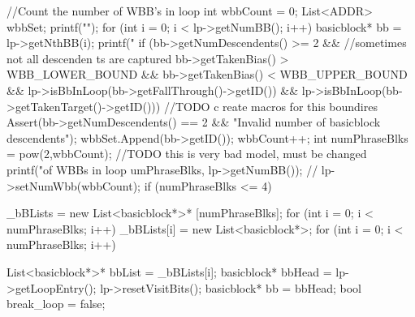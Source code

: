\begin{DoxyCode}
                                            {
        //Count the number of WBB's in loop
        int wbbCount = 0;
        List<ADDR> wbbSet;
        printf("\n");
        for (int i = 0; i < lp->getNumBB(); i++) {
                basicblock* bb = lp->getNthBB(i);
                printf("%
                if (bb->getNumDescendents() >= 2 && //sometimes not all descenden
      ts are captured
                        bb->getTakenBias() > WBB_LOWER_BOUND && 
                    bb->getTakenBias() < WBB_UPPER_BOUND &&
                    lp->isBbInLoop(bb->getFallThrough()->getID()) &&
                        lp->isBbInLoop(bb->getTakenTarget()->getID())) { //TODO c
      reate macros for this boundires
                        Assert(bb->getNumDescendents() == 2 && "Invalid number of
       basicblock descendents\n");
                        wbbSet.Append(bb->getID());
                        wbbCount++;
                }
        }
        int numPhraseBlks = pow(2,wbbCount); //TODO this is very bad model, must 
      be changed
        printf("\nnumber of WBBs in loop %
      umPhraseBlks, lp->getNumBB());
        // lp->setNumWbb(wbbCount);
        if (numPhraseBlks <= 4) {
                _bBLists = new List<basicblock*>* [numPhraseBlks];
                for (int i = 0; i < numPhraseBlks; i++) {
                        _bBLists[i] = new List<basicblock*>;
                }
                for (int i = 0; i < numPhraseBlks; i++) {
                        List<basicblock*>* bbList = _bBLists[i];
                        basicblock* bbHead = lp->getLoopEntry();
                        lp->resetVisitBits();
                        basicblock* bb = bbHead;
                        bool break_loop = false;

}}}
\end{DoxyCode}
